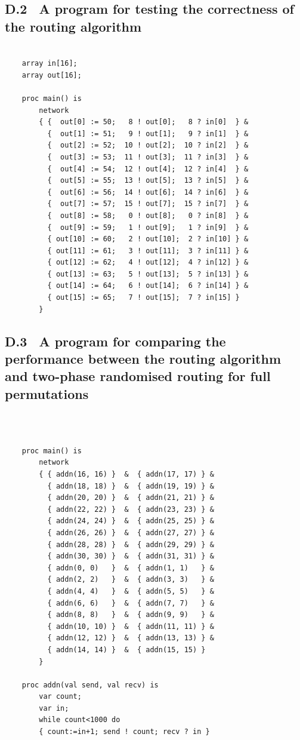 \documentclass[a4paper, 12pt]{article}
\begin{document}
\subsection*{D.2 \ A program for testing the correctness of the routing algorithm}

\begin{lstlisting}

    array in[16];
    array out[16];

    proc main() is
        network
        { {  out[0] := 50;   8 ! out[0];   8 ? in[0]  } &
          {  out[1] := 51;   9 ! out[1];   9 ? in[1]  } &
          {  out[2] := 52;  10 ! out[2];  10 ? in[2]  } &
          {  out[3] := 53;  11 ! out[3];  11 ? in[3]  } &
          {  out[4] := 54;  12 ! out[4];  12 ? in[4]  } &
          {  out[5] := 55;  13 ! out[5];  13 ? in[5]  } &
          {  out[6] := 56;  14 ! out[6];  14 ? in[6]  } &
          {  out[7] := 57;  15 ! out[7];  15 ? in[7]  } &
          {  out[8] := 58;   0 ! out[8];   0 ? in[8]  } &
          {  out[9] := 59;   1 ! out[9];   1 ? in[9]  } &
          { out[10] := 60;   2 ! out[10];  2 ? in[10] } &
          { out[11] := 61;   3 ! out[11];  3 ? in[11] } &
          { out[12] := 62;   4 ! out[12];  4 ? in[12] } &
          { out[13] := 63;   5 ! out[13];  5 ? in[13] } &
          { out[14] := 64;   6 ! out[14];  6 ? in[14] } &
          { out[15] := 65;   7 ! out[15];  7 ? in[15] } 
        }

\end{lstlisting}

\newpage
\subsection*{D.3 \ A program for comparing the performance between the routing algorithm and two-phase randomised routing for full permutations}
\ 
\begin{lstlisting}

    proc main() is
        network
        { { addn(16, 16) }  &  { addn(17, 17) } &
          { addn(18, 18) }  &  { addn(19, 19) } &
          { addn(20, 20) }  &  { addn(21, 21) } &
          { addn(22, 22) }  &  { addn(23, 23) } &
          { addn(24, 24) }  &  { addn(25, 25) } &
          { addn(26, 26) }  &  { addn(27, 27) } &
          { addn(28, 28) }  &  { addn(29, 29) } &
          { addn(30, 30) }  &  { addn(31, 31) } &
          { addn(0, 0)   }  &  { addn(1, 1)   } &
          { addn(2, 2)   }  &  { addn(3, 3)   } &
          { addn(4, 4)   }  &  { addn(5, 5)   } &
          { addn(6, 6)   }  &  { addn(7, 7)   } &
          { addn(8, 8)   }  &  { addn(9, 9)   } &
          { addn(10, 10) }  &  { addn(11, 11) } &
          { addn(12, 12) }  &  { addn(13, 13) } &
          { addn(14, 14) }  &  { addn(15, 15) }
        }

    proc addn(val send, val recv) is 
        var count;
        var in;
        while count<1000 do
        { count:=in+1; send ! count; recv ? in }

\end{lstlisting}
\end{document}
